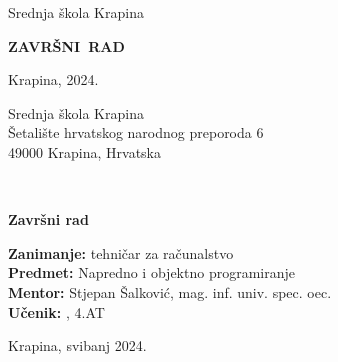 \begin{titlepage}
    \begin{center}
        \Large
        Srednja škola Krapina
    \end{center}

    \vfill

    \begin{center}
            \normalsize \Author

            \vspace{0.5cm}

            \mbox{\huge\textbf{ZAVRŠNI RAD}}

            \vspace{0.3cm}

            \normalsize \Title
    \end{center}

    \vfill

    \begin{center}
        \normalsize
        Krapina, 2024.
    \end{center}
\end{titlepage}

\cleardoublepage

\begin{titlepage}
    \begin{flushleft}
        Srednja škola Krapina\\
        Šetalište hrvatskog narodnog preporoda 6\\
        49000 Krapina, Hrvatska\\
    \end{flushleft}

    \vfill

    \begin{center}
        \LARGE
        \textbf{\Title}\\

        \vspace{0.5cm}

        \Large
        \textcolor{\accentColor}{\textbf{Završni rad}}\\

    \end{center}

    \vfill

    \begin{flushleft}
        \normalsize
        \textbf{Zanimanje:} tehničar za računalstvo\\
        \textbf{Predmet:} Napredno i objektno programiranje\\
        \textbf{Mentor:} Stjepan Šalković, mag. inf. univ. spec. oec.\\
        \textbf{Učenik:} \Author, 4.AT\\
    \end{flushleft}

    \vspace{1cm}

    \begin{center}
        Krapina, svibanj 2024.
    \end{center}
\end{titlepage}
